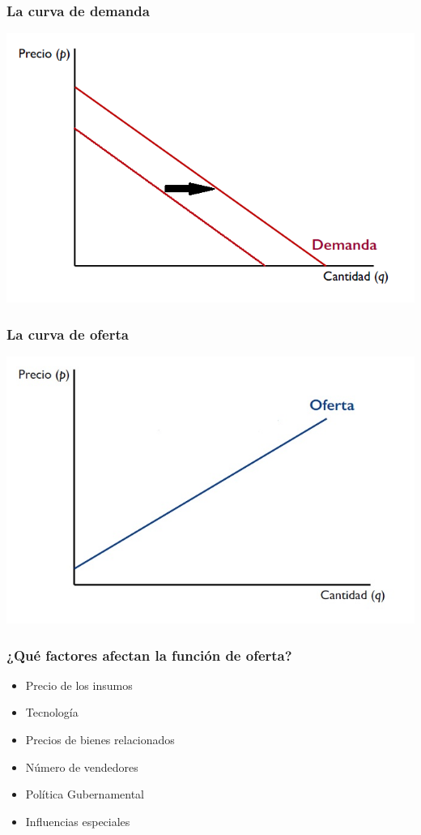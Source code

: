 \documentclass{beamer}
\begin{document}
\begin{frame}
\frametitle{La curva de demanda}
\includegraphics[scale=0.6]{Figures/Tema_07.1_curvadeldemandanew.png}
\end{frame}

\begin{frame}
\frametitle{ La curva de oferta}
\includegraphics[scale=0.6]{Figures/Tema_07.2_curvadeoferta.jpg}
\end{frame}

\begin{frame}
\frametitle{¿Qué factores afectan la función de oferta?}
\begin{itemize}
    \item Precio de los insumos
    \item Tecnología
    \item Precios de bienes relacionados
    \item Número de vendedores
    \item Política Gubernamental
    \item Influencias especiales
\end{itemize}
\end{frame}
\end{document}

